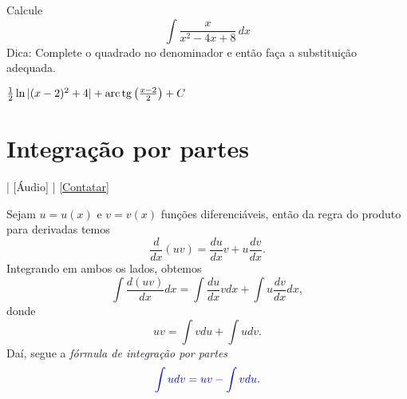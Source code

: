 \begin{exer}
  Calcule
  \begin{equation}
    \int\frac{x}{x^2-4x+8}\,dx
  \end{equation}
  Dica: Complete o quadrado no denominador e então faça a substituição adequada.
\end{exer}
\begin{resp}
  $\frac{1}{2}\ln|(x-2)^2+4|+\operatorname{arc}\operatorname{tg}\left(\frac{x-2}{2}\right) + C$
\end{resp}


\section{Integração por partes}\label{cap_int_sec_partes}

\begin{flushright}
  [Vídeo] | [Áudio] | \href{https://phkonzen.github.io/notas/contato.html}{[Contatar]}
\end{flushright}

Sejam $u=u(x)$ e $v=v(x)$ funções diferenciáveis, então da regra do produto para derivadas temos
\begin{equation}
  \frac{d}{dx}(uv) = \frac{du}{dx}v + u\frac{dv}{dx}.
\end{equation}
Integrando em ambos os lados, obtemos
\begin{equation}
  \int \frac{d (uv)}{dx}dx = \int \frac{du}{dx}vdx + \int u\frac{dv}{dx}dx,
\end{equation}
donde
\begin{equation}
  uv = \int vdu + \int udv.
\end{equation}
Daí, segue a \emph{fórmula de integração por partes}
\begin{equation}
  {\color{blue}\int udv = uv - \int vdu}.
\end{equation}

